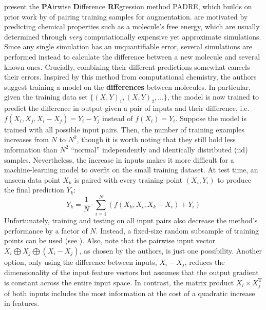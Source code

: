 \newpar \textcite{padre-rf-2021} present the \textbf{PA}irwise \textbf{D}ifference \textbf{RE}gression method PADRE, which builds on prior work by \textcite{pairwise-images-2018} of pairing training samples for augmentation. \citeauthor{padre-rf-2021} are motivated by predicting chemical properties such as a molecule's free energy, which are usually determined through \textit{very} computationally expensive yet approximate simulations. Since any single simulation has an unquantifiable error, several simulations are performed instead to calculate the difference between a new molecule and several known ones. Crucially, combining their different predictions somewhat cancels their errors. Inspired by this method from computational chemistry, the authors suggest training a model on the \textbf{differences} between molecules. In particular, given the training data set $\{ (X, Y)_1, (X, Y)_2, ... \}$, the model is now trained to predict the difference in output given a pair of inputs and their difference, i.e. $f(X_i, X_j, X_i - X_j) = Y_i - Y_j$ instead of $f(X_i) = Y_i$. Suppose the model is trained with all possible input pairs. Then, the number of training examples increases from $N$ to $N^2$, though it is worth noting that they still hold less information than $N^2$ ``normal'' independently and identically distributed (iid) samples. Nevertheless, the increase in inputs makes it more difficult for a machine-learning model to overfit on the small training dataset. At test time, an unseen data point $X_k$ is paired with every training point $(X_i, Y_i)$ to produce the final prediction $Y_k$:
\begin{equation*}
    Y_k = \frac{1}{N} \cdot \sum_{i=1}^{N}{\left(f(X_k, X_i, X_k - X_i) + Y_i \right)}
\end{equation*}
Unfortunately, training and testing on all input pairs also decrease the method's performance by a factor of $N$. Instead, a fixed-size random subsample of training points can be used (see ). Also, note that the pairwise input vector $X_i \bigoplus X_j \bigoplus (X_i - X_j)$, as chosen by the authors, is just one possibility. Another option, only using the difference between inputs, $X_i - X_j$, reduces the dimensionality of the input feature vectors but assumes that the output gradient is constant across the entire input space. In contrast, the matrix product $X_i \times X_{j}^{\text{T}}$ of both inputs includes the most information at the cost of a quadratic increase in features.

